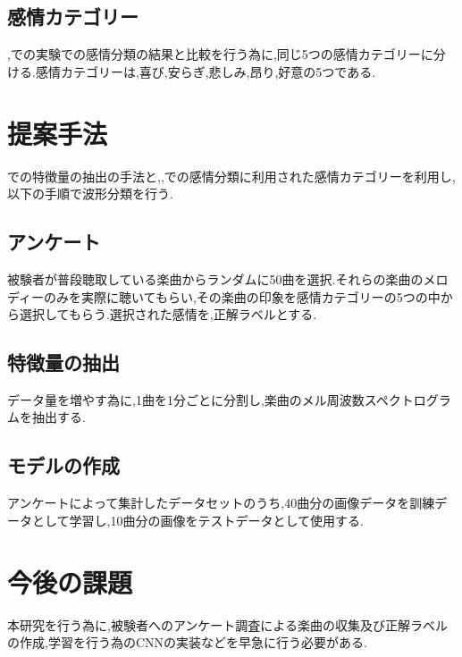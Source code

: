 \documentclass[twocolumn,twoside,9.5pt]{jarticle}
\begin{document}
\subsection{感情カテゴリー}
\cite{gushiken1},\cite{gushiken2}での実験での感情分類の結果と比較を行う為に,同じ5つの感情カテゴリーに分ける.感情カテゴリーは,喜び,安らぎ,悲しみ,昂り,好意の5つである.
\section{提案手法}
\cite{deep}での特徴量の抽出の手法と,\cite{gushiken1},\cite{gushiken2}での感情分類に利用された感情カテゴリーを利用し,以下の手順で波形分類を行う.

\subsection{アンケート}
被験者が普段聴取している楽曲からランダムに50曲を選択.それらの楽曲のメロディーのみを実際に聴いてもらい,その楽曲の印象を感情カテゴリーの5つの中から選択してもらう.選択された感情を,正解ラベルとする.\\

\subsection{特徴量の抽出}
データ量を増やす為に,1曲を1分ごとに分割し,楽曲のメル周波数スペクトログラムを抽出する.\\

\subsection{モデルの作成}
アンケートによって集計したデータセットのうち,40曲分の画像データを訓練データとして学習し,10曲分の画像をテストデータとして使用する.\\


\section{今後の課題}
本研究を行う為に,被験者へのアンケート調査による楽曲の収集及び正解ラベルの作成,学習を行う為のCNNの実装などを早急に行う必要がある.\\
\end{document}
